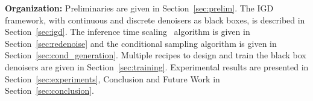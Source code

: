 \textbf{Organization:}
  Preliminaries are given in Section~\ref{sec:prelim}. The IGD framework, with continuous and discrete denoisers as black boxes, is described in Section~\ref{sec:igd}. The inference time scaling \redenoise~algorithm is given in Section~\ref{sec:redenoise} and the conditional sampling algorithm is given in Section~\ref{sec:cond_generation}. Multiple recipes to design and train the black box denoisers are given in Section~\ref{sec:training}. Experimental results are presented in Section~\ref{sec:experiments}, Conclusion and Future Work in Section~\ref{sec:conclusion}.
